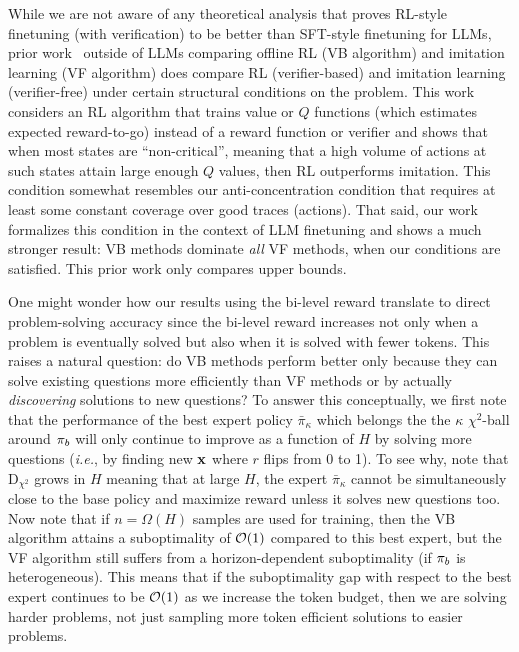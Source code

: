 \begin{remark}
While we are not aware of any theoretical analysis that proves RL-style finetuning (with verification) to be better than SFT-style finetuning for LLMs, prior work~\citep{kumar2022should} outside of LLMs comparing offline RL (VB algorithm) and imitation learning (VF algorithm) does compare RL (verifier-based) and imitation learning (verifier-free) under certain structural conditions on the problem. This work considers an RL algorithm that trains value or $Q$ functions (which estimates expected reward-to-go) instead of a reward function or verifier and shows that when most states are ``non-critical'', meaning that a high volume of actions at such states attain large enough $Q$ values, then RL outperforms imitation. This condition somewhat resembles our anti-concentration condition that requires at least some constant coverage over good traces (actions).  That said, our work formalizes this condition in the context of LLM finetuning and shows a much stronger result: VB methods dominate \emph{all} VF methods, when our conditions are satisfied. This prior work only compares upper bounds.
\end{remark}

\vspace{0.075cm}
\begin{remark} 
One might wonder how our results using the bi-level reward translate to direct problem-solving accuracy since the bi-level reward increases not only when a problem is eventually solved but also when it is solved with fewer tokens. This raises a natural question: do VB methods perform better only because they can solve existing questions more efficiently than VF methods or by actually \emph{discovering} solutions to new questions? To answer this conceptually, we first note that the performance of the best expert policy $\bar{\pi}_\kappa$ which belongs the the $\kappa$ $\chi^2$-ball around $\pi_b$ will only continue to improve as a function of $H$ by solving more questions (\textit{i.e.}, by finding new $\mathbf{x}$ where $r$ flips from 0 to 1). To see why, note that $\mathrm{D}_{\chi^2}$ grows  in $H$ meaning that at large $H$, the expert $\bar{\pi}_\kappa$ cannot be simultaneously close to the base policy and maximize reward  unless it solves new questions too. Now note that if $n = \Omega(H)$ samples are used for training, then the VB algorithm attains a suboptimality of ${\mathcal{O}}(1)$ compared to this best expert, but the VF algorithm still suffers from a horizon-dependent suboptimality (if $\pi_b$ is heterogeneous). This means that if the suboptimality gap with respect to the best expert continues to be ${\mathcal{O}}(1)$ as we increase the token budget, then we are solving harder problems, not just sampling more token efficient solutions to easier problems. 
\end{remark}



